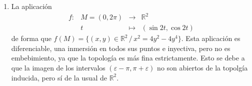 \begin{ejem}
\begin{enumerate}
An\'alogamente con la otra carta. As\'i, $i : \bold S^2 \hookrightarrow \mathbb R^3$ es subvariedad.

Adem\'as, es un embebimiento. La topolog\'ia inducida por este atlas es equivalente al de las ortogonales, ya que son compatibles, y ya vimos que tiene la topolog\'ia de $\bold S^2$ como subconjunto de $\mathbb R^3$. De esta forma, es un embebimiento.

\item La aplicaci\'on
$$\begin{array}{rrcl}
     f: & M=(0, 2\pi) & \longrightarrow & \mathbb R^2  \\
     & t & \longmapsto & (\sin 2t, \cos 2t)
\end{array}$$
de forma que $f(M)=\{(x,y) \in \mathbb R^2\, / \, x^2=4y^2-4y^4\}$. Esta aplicaci\'on es diferenciable, una inmersi\'on en todos sus puntos e inyectiva, pero no es embebimiento, ya que la topolog\'ia es m\'as fina estrictamente. Esto se debe a que la imagen de los intervalos $(\varepsilon-\pi, \pi+\varepsilon)$ no son abiertos de la topolg\'ia inducida, pero s\'i de la usual de $\mathbb R^2$.
\end{enumerate}
\end{ejem}

